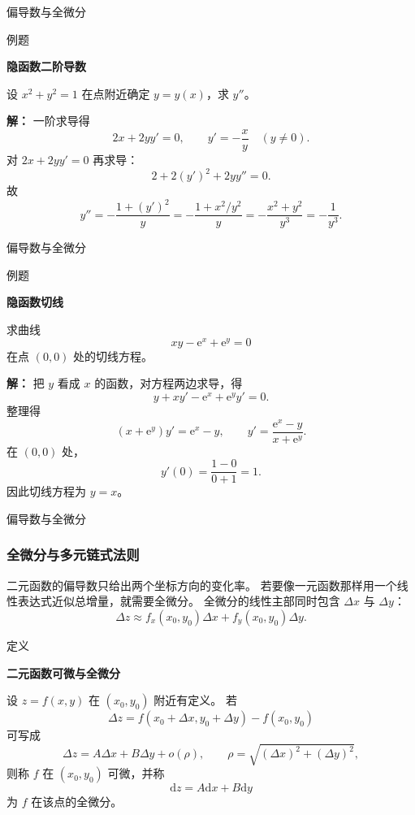 \documentclass[aspectratio=169,10pt,fontset=fandol]{ctexbeamer}
\newcommand{\dd}{\mathrm{d}}
\newcommand{\ee}{\mathrm{e}}
\begin{document}
\begin{frame}[t,fragile]{偏导数与全微分}
\normalsize
\begin{block}{例题}
{\normalsize
\textbf{隐函数二阶导数}\par

	设 $x^2+y^2=1$ 在点附近确定 $y=y(x)$，求 $y''$。

}
\end{block}
\pause
{\normalsize
\textbf{解：}
一阶求导得
	\[
	2x+2yy'=0,\qquad y'=-\frac{x}{y}\quad(y\neq0).
	\]
	对 $2x+2yy'=0$ 再求导：
	\[
	2+2(y')^2+2yy''=0.
	\]
	故
	\[
	y''=-\frac{1+(y')^2}{y}=-\frac{1+x^2/y^2}{y}
	=-\frac{x^2+y^2}{y^3}=-\frac1{y^3}.
	\]

}
\end{frame}
\begin{frame}[t,fragile]{偏导数与全微分}
\small
\begin{block}{例题}
{\small
\textbf{隐函数切线}\par

	求曲线
	\[
	xy-\ee^x+\ee^y=0
	\]
	在点 $(0,0)$ 处的切线方程。

}
\end{block}
\pause
{\small
\textbf{解：}
把 $y$ 看成 $x$ 的函数，对方程两边求导，得
	\[
	y+xy'-\ee^x+\ee^y y'=0.
	\]
	整理得
	\[
	(x+\ee^y)y'=\ee^x-y,\qquad
	y'=\frac{\ee^x-y}{x+\ee^y}.
	\]
	在 $(0,0)$ 处，
	\[
	y'(0)=\frac{1-0}{0+1}=1.
	\]
	因此切线方程为 $y=x$。

}
\end{frame}
\begin{frame}[t,fragile]{偏导数与全微分}
\small
{\small
\subsubsection*{全微分与多元链式法则}


}
{\small
二元函数的偏导数只给出两个坐标方向的变化率。 若要像一元函数那样用一个线性表达式近似总增量，就需要全微分。 全微分的线性主部同时包含 $\Delta x$ 与 $\Delta y$：
\[
\Delta z\approx f_x(x_0,y_0)\Delta x+f_y(x_0,y_0)\Delta y.
\]


}
\begin{block}{定义}
{\small
\textbf{二元函数可微与全微分}\par

设 $z=f(x,y)$ 在 $(x_0,y_0)$ 附近有定义。 若
\[
\Delta z=f(x_0+\Delta x,y_0+\Delta y)-f(x_0,y_0)
\]
可写成
\[
\Delta z=A\Delta x+B\Delta y+o(\rho),
\qquad \rho=\sqrt{(\Delta x)^2+(\Delta y)^2},
\]
则称 $f$ 在 $(x_0,y_0)$ 可微，并称
\[
\dd z=A\dd x+B\dd y
\]
为 $f$ 在该点的全微分。

}
\end{block}
\end{frame}
\end{document}
